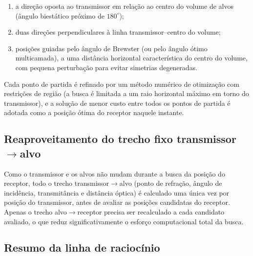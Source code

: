 \documentclass[11pt,a4paper]{article}
\begin{document}
\begin{enumerate}[nosep]
  \item a direção oposta ao transmissor em relação ao centro do volume de alvos (ângulo biestático
  próximo de $180^\circ$);
  \item duas direções perpendiculares à linha transmissor--centro do volume;
  \item posições guiadas pelo ângulo de Brewster (ou pelo ângulo ótimo multicamada), a uma
  distância horizontal característica do centro do volume, com pequena perturbação para evitar
  simetrias degeneradas.
\end{enumerate}
Cada ponto de partida é refinado por um método numérico de otimização com restrições de região
(a busca é limitada a um raio horizontal máximo em torno do transmissor), e a solução de menor
custo entre todos os pontos de partida é adotada como a posição ótima do receptor naquele
instante.

\subsection{Reaproveitamento do trecho fixo transmissor\texorpdfstring{$\to$}{->}alvo}

Como o transmissor e os alvos não mudam durante a busca da posição do receptor, todo o trecho
transmissor$\to$alvo (ponto de refração, ângulo de incidência, transmitância e distância óptica) é
calculado uma única vez por posição do transmissor, antes de avaliar as posições candidatas do
receptor. Apenas o trecho alvo$\to$receptor precisa ser recalculado a cada candidato avaliado, o
que reduz significativamente o esforço computacional total da busca.

\subsection{Resumo da linha de raciocínio}
\end{document}
